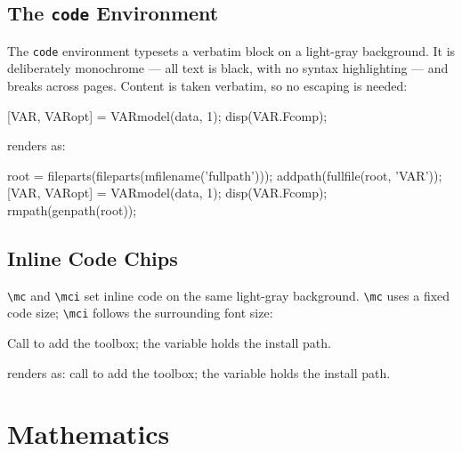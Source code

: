\documentclass[11pt,a4paper]{article}
\begin{document}
\subsection{The \texttt{code} Environment}

The \verb|code| environment typesets a verbatim block on a light-gray background. It is deliberately monochrome --- all text is black, with no syntax highlighting --- and breaks across pages. Content is taken verbatim, so no escaping is needed:

\begin{democode}
\begin{code}
[VAR, VARopt] = VARmodel(data, 1);
disp(VAR.Fcomp);   %
\end{code}
\end{democode}

\noindent renders as:

\begin{code}
root = fileparts(fileparts(mfilename('fullpath')));
addpath(fullfile(root, 'VAR'));
[VAR, VARopt] = VARmodel(data, 1);   %
disp(VAR.Fcomp);                     %
rmpath(genpath(root));
\end{code}

\subsection{Inline Code Chips}

\verb|\mc| and \verb|\mci| set inline code on the same light-gray background. \verb|\mc| uses a fixed code size; \verb|\mci| follows the surrounding font size:

\begin{democode}
Call  to add the toolbox; the
 variable holds the install path.
\end{democode}

\noindent renders as: call  to add the toolbox; the  variable holds the install path.

\section{Mathematics}
\end{document}
